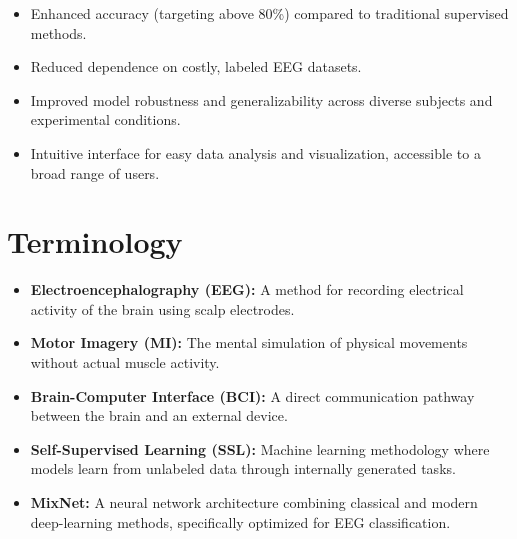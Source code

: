 \begin{itemize}

    \item Enhanced accuracy (targeting above 80\%) compared to traditional supervised methods.

    \item Reduced dependence on costly, labeled EEG datasets.

    \item Improved model robustness and generalizability across diverse subjects and experimental conditions.

    \item Intuitive interface for easy data analysis and visualization, accessible to a broad range of users.

\end{itemize}


\section{Terminology}
\label{sec:terminology}


\begin{itemize}

    \item \textbf{Electroencephalography (EEG):} A method for recording electrical activity of the brain using scalp electrodes.

    \item \textbf{Motor Imagery (MI):} The mental simulation of physical movements without actual muscle activity.

    \item \textbf{Brain-Computer Interface (BCI):} A direct communication pathway between the brain and an external device.

    \item \textbf{Self-Supervised Learning (SSL):} Machine learning methodology where models learn from unlabeled data through internally generated tasks.

    \item \textbf{MixNet:} A neural network architecture combining classical and modern deep-learning methods, specifically optimized for EEG classification.

\end{itemize}
